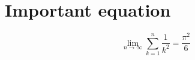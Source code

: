
\chapter{Important equation}
\label{cha:important-equation}

\begin{equation}
  \label{eq:1}
  \lim_{n \to \infty} \sum_{k=1}^n \frac{1}{k^2} = \frac{\pi^2}{6}
\end{equation}


